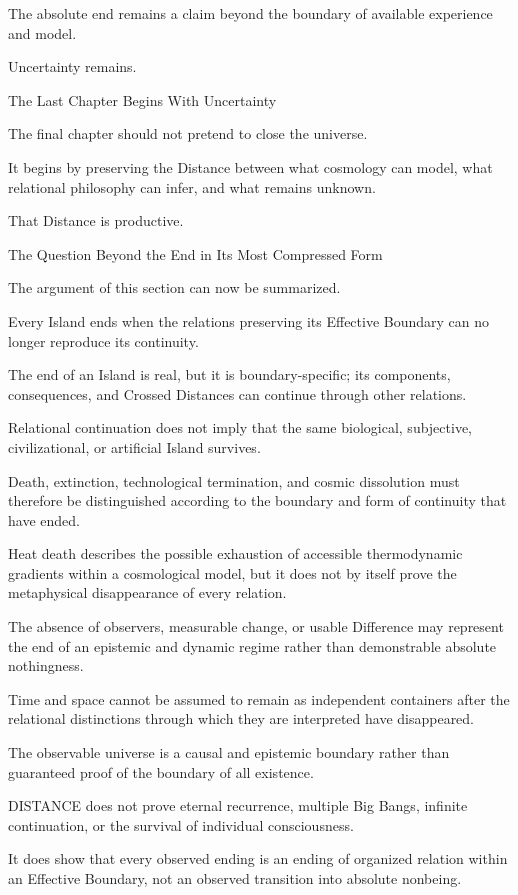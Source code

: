 The absolute end remains a claim beyond the boundary of available experience and model.

Uncertainty remains.

The Last Chapter Begins With Uncertainty

The final chapter should not pretend to close the universe.

It begins by preserving the Distance between what cosmology can model, what relational philosophy can infer, and what remains unknown.

That Distance is productive.

The Question Beyond the End in Its Most Compressed Form

The argument of this section can now be summarized.

Every Island ends when the relations preserving its Effective Boundary can no longer reproduce its continuity.

The end of an Island is real, but it is boundary-specific; its components, consequences, and Crossed Distances can continue through other relations.

Relational continuation does not imply that the same biological, subjective, civilizational, or artificial Island survives.

Death, extinction, technological termination, and cosmic dissolution must therefore be distinguished according to the boundary and form of continuity that have ended.

Heat death describes the possible exhaustion of accessible thermodynamic gradients within a cosmological model, but it does not by itself prove the metaphysical disappearance of every relation.

The absence of observers, measurable change, or usable Difference may represent the end of an epistemic and dynamic regime rather than demonstrable absolute nothingness.

Time and space cannot be assumed to remain as independent containers after the relational distinctions through which they are interpreted have disappeared.

The observable universe is a causal and epistemic boundary rather than guaranteed proof of the boundary of all existence.

DISTANCE does not prove eternal recurrence, multiple Big Bangs, infinite continuation, or the survival of individual consciousness.

It does show that every observed ending is an ending of organized relation within an Effective Boundary, not an observed transition into absolute nonbeing.

